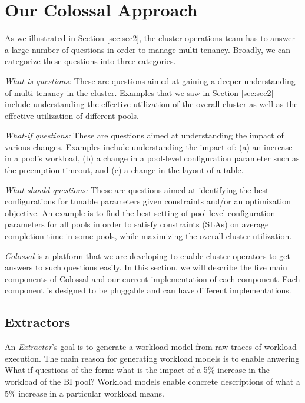 
\section{Our Colossal Approach}
\label{sec:sec3}

As we illustrated in Section \ref{sec:sec2}, the cluster operations
team has to answer a large number of questions in order to manage
multi-tenancy. Broadly, we can categorize these questions into
three categories. 

\squishlist

\item {\em What-is questions:} These are questions aimed at gaining
a deeper understanding of multi-tenancy in the cluster. Examples 
that we saw in Section \ref{sec:sec2} include 
understanding the effective utilization of the overall cluster 
as well as the effective utilization of different pools. 

\item {\em What-if questions:} These are questions aimed 
at understanding the impact of various changes. Examples include
understanding the impact of: (a) an increase in a pool's 
workload, (b) a change in a pool-level configuration
parameter such as the preemption timeout, 
and (c) a change in the layout of a table.

\item {\em What-should questions:}  These are questions aimed 
at identifying the best configurations for tunable parameters
given constraints and/or an optimization objective. 
An example is to find the best setting of pool-level 
configuration parameters for all pools in order to satisfy 
constraints (SLAs) on average completion time in some pools, 
while maximizing the overall cluster utilization. 

\squishend

{\em Colossal} is a platform that we are developing to 
enable cluster operators to get answers to such questions 
easily. In this section, we will describe the five main
components of Colossal and our current implementation of each component. 
Each component is designed to be pluggable and can have different 
implementations.

\subsection{Extractors}
An {\em Extractor}'s goal is to generate a workload model
from raw traces of workload execution. The main reason
for generating workload models is to enable anwering
What-if questions of the form: what is the impact of  
a 5\% increase in the workload of the BI pool? 
Workload models enable concrete descriptions of 
what a 5\% increase in a particular workload means.  

